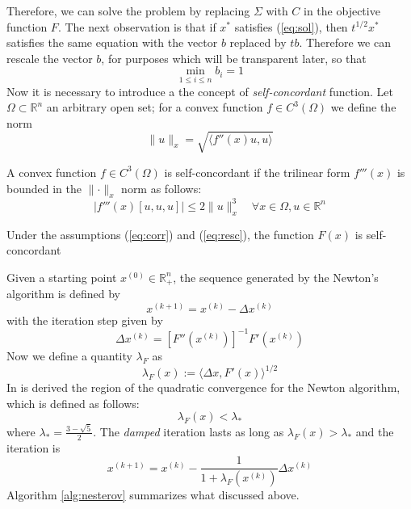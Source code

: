 Therefore, we can solve the problem by replacing $\Sigma$ with $C$ in the objective function $F$. The next observation is that if $x^*$ satisfies (\ref{eq:sol}), then $t^{1/2}x^*$ satisfies the same equation with the vector $b$ replaced by $tb$. Therefore we can rescale the vector $b$, for purposes which will be transparent later, so that
\begin{equation}\label{eq:resc}
\min_{1 \leq i \leq n} b_i = 1
\end{equation}
Now it is necessary to introduce a the concept of \textit{self-concordant} function. Let $\Omega \subset \mathbb{R}^n$ an arbitrary open set; for a convex function $f \in C^3(\Omega)$ we define the norm 
\begin{equation}
\parallel u \parallel _x = \sqrt{\langle f''(x)u,u\rangle}
\end{equation}
\begin{definition}
A convex function $f \in C^3(\Omega)$ is self-concordant if the trilinear form $f'''(x)$ is bounded in the $\parallel \cdot \parallel _x$ norm as follows:
\begin{equation}
|f'''(x)[u,u,u]| \leq 2\parallel u \parallel_x^3 \quad \forall x \in \Omega, u \in \mathbb{R}^n
\end{equation}
\end{definition}
\begin{lemma}
Under the assumptions  (\ref{eq:corr}) and (\ref{eq:resc}), the function $F(x)$ is self-concordant
\end{lemma}
Given a starting point $x^{(0)} \in \mathbb{R}^n_+$, the sequence generated by the Newton's algorithm is defined by
\begin{equation}
x^{(k+1)} = x^{(k)} - \Delta x^{(k)}
\end{equation}
with the iteration step given by
\begin{equation}
\Delta x^{(k)} = [F''(x^{(k)})]^{-1}F'(x^{(k)})
\end{equation}
Now we define a quantity $\lambda_F$ as
\begin{equation}
\lambda_F(x) := \langle \Delta x, F'(x)\rangle^{1/2}
\end{equation}
In \cite{nesterov} is derived the region of the quadratic convergence for the Newton algorithm, which is defined as follows:
\begin{equation}
\lambda_F(x) < \lambda_*
\end{equation} 
where $\lambda_* = \frac{3-\sqrt{5}}{2}$. The \textit{damped} iteration lasts as long as $\lambda_F(x) > \lambda_*$ and the iteration is
\begin{equation}
x^{(k+1)} = x^{(k)} - \frac{1}{1+\lambda_F(x^{(k)})}\Delta x^{(k)}
\end{equation}
Algorithm \ref{alg:nesterov} summarizes what discussed above.

